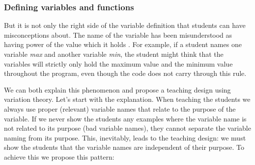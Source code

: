 \subsubsection{Defining variables and functions}

But it is not only the right side of the variable definition that students 
can 
have misconceptions about. The name of the variable has been misunderstood 
as 
having power of the value which it holds 
\parencite{MisconceptionsSurvey2017,Sleeman1984}. For example, if a student 
names one variable \emph{max} and another variable \emph{min}, the student 
might think that the variables will strictly only hold the maximum value and 
the minimum value throughout the program, even though the code does not 
carry through this rule. 

We can both explain this phenomenon and propose a teaching design using 
variation theory.
Let's start with the explanation.
When teaching the students we always use proper (\ie relevant) variable 
names 
that relate to the purpose of the variable.
If we never show the students any examples where the variable name is not 
related to its purpose (bad variable names), they cannot separate the 
variable 
naming from its purpose.
This, inevitably, leads to the teaching design:
we must show the students that the variable names are independent of their 
purpose. To achieve this we propose this pattern:

